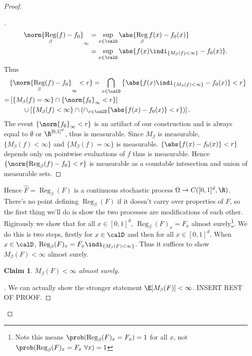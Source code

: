 \documentclass[fontsize=12pt, DIV=10]{scrreprt}
\theoremstyle{mydefn}
\newtheorem{claim}{Claim}
\theoremstyle{remark}
\newenvironment{subproof}[1][\proofname]{%
  \renewcommand{\qedsymbol}{$\blacksquare$}%
  \begin{proof}[#1]%
}{%
  \end{proof}%
}
\DeclareMathOperator{\reg}{Reg}
\begin{document}
\begin{proof}
\begin{subproof}
	\begin{align}
		\norm{\reg_{\beta}(f) - f_0}_{\infty}
		&= \sup_{x \in \calD} \abs{\reg_{\beta}f(x) - f_0(x)} \\
		&= \sup_{x \in \calD} \abs{f(x) \regindi - f_0(x)}.
	\end{align}
	Thus
	\begin{align}
		&\{\norm{\reg_{\beta}(f) - f_0}_{\infty} < r\}
		= \bigcap_{x \in \calD} \left\{ \abs{f(x) \regindi - f_0(x)} < r \right\} \\
		=& \left[ \{M_{\beta}(f) = \infty\} \cap \{\norm{f_0}_{\infty} < r\} \right] \nonumber \\
		 & \qquad \cup \left[ \{M_{\beta}(f) < \infty\} \cap \left( \cap_{x \in \calD} \{\abs{f(x) - f_0(x)} < r\} \right) \right].
	\end{align}
	The event $\{\norm{f_0}_{\infty} < r\}$ is an artifact of our construction and is always equal to $\emptyset$ or $\boxspace$, thus is measurable. Since $M_{\beta}$ is measurable, $\{M_{\beta}(f) < \infty\}$ and $\{M_{\beta}(f) = \infty\}$ is measurable. $\{\abs{f(x) - f_0(x)} < r\}$ depends only on pointwise evaluations of $f$ thus is measurable. Hence $\{\norm{\reg_{\beta}(f) - f_0} < r\}$ is measurable as a countable intesection and union of measurable sets.
	\end{subproof}

	Hence $\hat{F} = \reg_{\beta}(F)$ is a continuous stochastic process $\Omega \to C(\unitbox, \R)$. There's no point defining $\reg_{\beta}(F)$ if it doesn't carry over properties of $F$, so the first thing we'll do is show the two processes are modifications of each other. Rigirously we show that for all $x \in [0, 1]^d$, $\reg_{\beta}(F)_x = F_x$ almost surely\footnote{Note this means $\prob(\reg_{\beta}(F)_x = F_x) = 1$ for all $x$, not $\prob(\reg_{\beta}(F)_x = F_x \ \forall x) = 1$}. We do this is two steps, firstly for $x \in \calD$ and then for all $x \in [0, 1]^d$. When $x \in \calD$, $\reg_{\beta}(F)_x = F_x \indi_{\{M_{\beta}(F) < \infty\}}$. Thus it suffices to show $M_{\beta}(F) < \infty$ almost surely.
	\begin{claim}
		$M_{\beta}(F) < \infty$ almost surely.
	\end{claim}
	\begin{subproof}
		We can actually show the stronger statement $\E[M_{\beta}(F)] < \infty$. INSERT REST OF PROOF.
	\end{subproof}
	

\end{proof}
\end{document}
